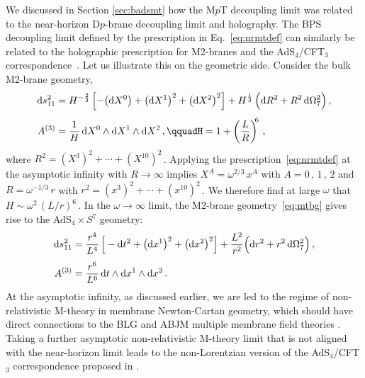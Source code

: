 \documentclass[11pt]{article}
\newcommand{\dd}{\mathrm{d}}
\begin{document}
We discussed in Section \ref{sec:badsmt} how the M$p$T decoupling limit was related to the near-horizon D$p$-brane decoupling limit and holography. 
The BPS decoupling limit defined by the prescription in Eq.~\eqref{eq:nrmtdef} can similarly be related to the holographic prescription for M2-branes and the AdS${}_4$/CFT${}_3$ correspondence~\cite{Maldacena:1997re}. 
Let us illustrate this on the geometric side. Consider the bulk M2-brane geometry, 
%
\begin{subequations} \label{eq:mtbg}
\begin{align}
    \dd s^2_{11} &= H^{- \frac{2}{3}} \, \Bigl[ - \bigl( \dd X^0 \bigr) + \bigl( \dd X^1 \bigr)^2 + \bigl( \dd X^2 \bigr)^2 \Bigr] + H^{\frac{1}{3}} \, \Bigl( \dd R^2 + R^2 \, \dd \Omega^2_7 \Bigr)\,, \\[4pt]
    A^{(3)} &= \frac{1}{H} \, \dd X^0 \wedge \dd X^1 \wedge \dd X^2\,, 
        \qquad%
    H = 1 + \left( \frac{L}{R} \right)^{\!\!6}\,,
\end{align}
\end{subequations}
%
where $R^2 = ( X^3 )^2 + \cdots + ( X^{10} )^2$\,. Applying the prescription~\eqref{eq:nrmtdef} at the asymptotic infinity with $R \rightarrow \infty$ implies $X^A = \omega^{2/3} \, x^A$ with $A = 0\,, \, 1\,, \, 2$ and $R = \omega^{-1/3} \, r$ with $r^2 = (x^3)^2 + \cdots + (x^{10})^2$\,. We therefore find at large $\omega$ that
%
$H \sim \omega^2 \, (L / r)^6$\,.
%
In the $\omega \rightarrow \infty$ limit, the M2-brane geometry~\eqref{eq:mtbg} gives rise to the AdS${}_4 \times S^7$ geometry:
%
\begin{subequations} \label{eq:adsf}
\begin{align}
    \dd s^2_{11} &= \frac{r^4}{L^4} \, \Big[ - \dd t^2 + \bigl( \dd x^1 \bigr)^2 + \bigl( \dd x^2 \bigr)^2 \Bigr] + \frac{L^2}{r^2} \Bigl( \dd r^2 + r^2 \, \dd\Omega^2_7 \Bigr)\,, \\[4pt]
    A^{(3)} &= \frac{r^6}{L^6} \, \dd t \wedge \dd x^1 \wedge \dd x^2\,. 
\end{align}
\end{subequations}
%
At the asymptotic infinity, as discussed earlier, we are led to the regime of non-relativistic M-theory in membrane Newton-Cartan geometry, which should have direct connections to the BLG and ABJM multiple membrane field theories \cite{Bagger:2007jr, Gustavsson:2007vu, Aharony:2008ug}. Taking a further asymptotic non-relativistic M-theory limit that is not aligned with the near-horizon limit leads to the non-Lorentzian version of the AdS${}_4$/CFT${}_3$ correspondence proposed in \cite{Lambert:2024uue}.
\end{document}
